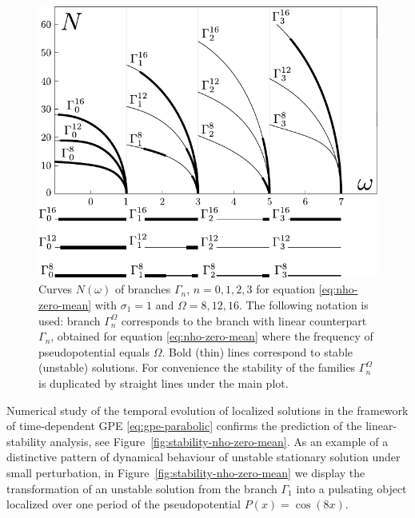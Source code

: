 \begin{figure}[h]
\centering
	\includegraphics[scale = 1]{pic/branches with linear counterpart, zero mean cosine nho}
	\caption{
		Curves $N(\omega)$ of branches $\Gamma_n$, $n = 0, 1, 2, 3$ for equation \eqref{eq:nho-zero-mean} with $\sigma_1 = 1$ and $\Omega = 8, 12, 16$.
		The following notation is used: branch $\Gamma_n^{\Omega}$ corresponds to the branch with linear counterpart $\Gamma_n$, obtained for equation \eqref{eq:nho-zero-mean} where the frequency of pseudopotential equals $\Omega$.
		Bold (thin) lines correspond to stable (unstable) solutions.
		For convenience the stability of the families $\Gamma_n^{\Omega}$ is duplicated by straight lines under the main plot.
	}
\label{fig:branches-with-linear-counterpart-zero-mean}
\end{figure}

Numerical study of the temporal evolution of localized solutions in the framework of time-dependent GPE \eqref{eq:gpe-parabolic} confirms the prediction of the linear-stability analysis, see Figure~\ref{fig:stability-nho-zero-mean}.
As an example of a distinctive pattern of dynamical behaviour of unstable stationary solution under small perturbation, in Figure~\ref{fig:stability-nho-zero-mean} we display the transformation of an unstable solution from the branch $\Gamma_1$ into a pulsating object localized over one period of the pseudopotential $P(x) = \cos (8x)$.

